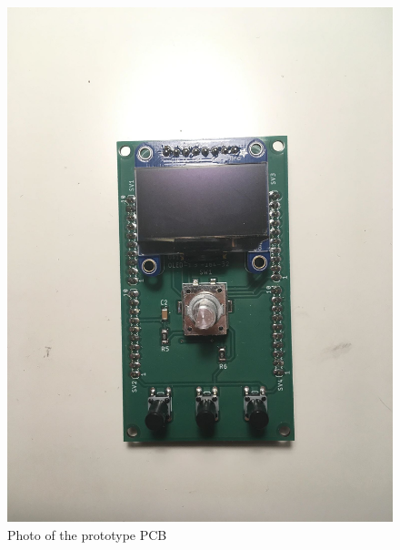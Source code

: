 \documentclass{article}
\begin{document}
  \begin{figure}[H]
  	\centering
  	\includegraphics[width=1\linewidth]{IMG_2389.jpg}
  	\caption{Photo of the prototype PCB}
 	 \label{fig: pcb22t}
\end{figure}
\end{document}

